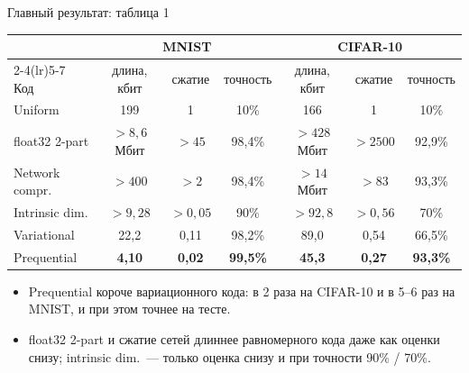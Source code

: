 \documentclass[aspectratio=169,10pt]{beamer}
\begin{document}
\begin{frame}{Главный результат: таблица 1}
  \centering
  \small
  \begin{tabular}{lcccccc}
    \toprule
     & \multicolumn{3}{c}{MNIST} & \multicolumn{3}{c}{CIFAR-10} \\
    \cmidrule(lr){2-4}\cmidrule(lr){5-7}
    Код & длина, кбит & сжатие & точность & длина, кбит & сжатие & точность \\
    \midrule
    Uniform & 199 & 1 & 10\% & 166 & 1 & 10\% \\
    \midrule
    float32 2-part & $>8{,}6$ Мбит & $>45$ & 98,4\% & $>428$ Мбит & $>2500$ & 92,9\% \\
    Network compr. & $>400$ & $>2$ & 98,4\% & $>14$ Мбит & $>83$ & 93,3\% \\
    Intrinsic dim. & $>9{,}28$ & $>0{,}05$ & 90\% & $>92{,}8$ & $>0{,}56$ & 70\% \\
    \midrule
    Variational & 22,2 & 0,11 & 98,2\% & 89,0 & 0,54 & 66,5\% \\
    Prequential & \textbf{4,10} & \textbf{0,02} & \textbf{99,5\%} & \textbf{45,3} & \textbf{0,27} & \textbf{93,3\%} \\
    \bottomrule
  \end{tabular}
  \par{}

  \raggedright
  \begin{itemize}
    \item Prequential короче вариационного кода: в 2 раза на CIFAR-10 и в 5--6 раз на MNIST, и при этом точнее на тесте.
    \item float32 2-part и сжатие сетей длиннее равномерного кода даже как оценки снизу; intrinsic dim.\ --- только оценка снизу и при точности 90\% / 70\%.
  \end{itemize}
\end{frame}
\end{document}
